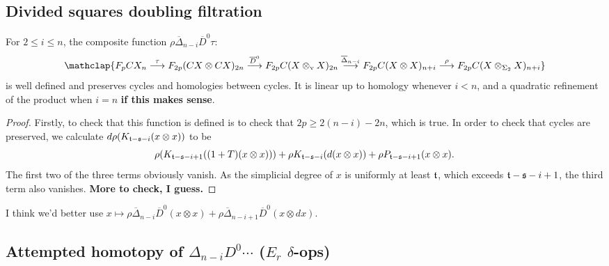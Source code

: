 \documentclass[10pt]{article}
\begin{document}
\begin{Adams sseq operations old version}
\subsection{Divided squares doubling filtration}
{\tiny\begin{prop}
For $2\leq i\leq n$, the composite function $\rho\overline{\Delta}_{n-i}\overline{D}^0\tau$:
\[\mathclap{F_p CX_{n}\overset{\tau}{\to} F_{2p}(CX\otimes CX)_{2n}\overset{\overline{D}^0}{\to}F_{2p}C(X\otimes_\textup{v} X)_{2n}\overset{\overline{\Delta}_{n-i}}{\to}F_{2p}C(X\otimes X)_{n+i}\overset{\rho}{\to}F_{2p}C(X\otimes_{\Sigma_2} X)_{n+i}}\]
is well defined and preserves cycles and homologies between cycles. It is linear up to homology whenever $i<n$, and a quadratic refinement of the product when $i=n$ \textbf{if this makes sense}.
\end{prop}
\begin{proof}
Firstly, to check that this function is defined is to check that $2p\geq2(n-i)-2n$, which is true. In order to check that cycles are preserved, we calculate $d\rho(K_{\mathfrak{t}-\mathfrak{s}-i}(x\otimes x))$ to be
\[\rho(K_{\mathfrak{t}-\mathfrak{s}-i+1}((1+T)(x\otimes x)))+\rho K_{\mathfrak{t}-\mathfrak{s}-i}(d(x\otimes x))+\rho P_{\mathfrak{t}-\mathfrak{s}-i+1}(x\otimes x).\]
The first two of the three terms obviously vanish. As the simplicial degree of $x$ is uniformly at least $\mathfrak{t}$, which exceeds $\mathfrak{t}-\mathfrak{s}-i+1$, the third term also vanishes.
\textbf{More to check, I guess.}
\end{proof}}
I think we'd better use $x\mapsto\rho\overline{\Delta}_{n-i}\overline{D}^0(x\otimes x)+\rho\overline{\Delta}_{n-i+1}\overline{D}^0(x\otimes dx)$.
\subsection{Attempted homotopy of $\Delta_{n-i} D^{0}\cdots$ ($E_r$ $\delta$-ops)}


\end{Adams sseq operations old version}
\end{document}

